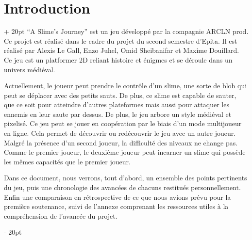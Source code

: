 \documentclass[a4paper, 12pt, twoside]{article}
\newcommand{\ind}[1][20pt]{\advance\leftskip + #1}
\newcommand{\deind}[1][20pt]{\advance\leftskip - #1}
\newenvironment{indt}[2][20pt]{#2 \par \ind[#1]}{\par \deind} %
\begin{document}
    

    \tableofcontents
    \newpage

    \begin{indt}{\section{Introduction}}
        “A Slime's Journey” est un jeu développé par la compagnie ARCLN prod. Ce projet est réalisé dans le cadre du projet du second semestre d'Epita. Il est réalisé par Alexis Le Gall, Enzo Juhel, Omid Sheibanifar et Maxime Douillard. Ce jeu est un platformer 2D reliant histoire et énigmes et se déroule dans un univers médiéval.

        Actuellement, le joueur peut prendre le contrôle d'un slime, une sorte de blob qui peut se déplacer avec des petits sauts. De plus, ce slime est capable de sauter, que ce soit pour atteindre d'autres plateformes mais aussi pour attaquer les ennemis en leur saute par dessus. De plus, le jeu arbore un style médiéval et pixelisé. Ce jeu peut se jouer en coopération par le biais d'un mode multijoueur en ligne. Cela permet de découvrir ou redécouvrir le jeu avec un autre joueur. Malgré la présence d'un second joueur, la difficulté des niveaux ne change pas. Comme le premier joueur, le deuxième joueur peut incarner un slime qui possède les mêmes capacités que le premier joueur.

        Dans ce document, nous verrons, tout d'abord, un ensemble des points pertinents du jeu, puis une chronologie des avancées de chacuns restitués personnellement. Enfin une comparaison en rétrospective de ce que nous avions prévu pour la première soutenance, suivi de l'annexe comprenant les ressources utiles à la compréhension de l'avancée du projet.
    \end{indt}
    
\end{document}
